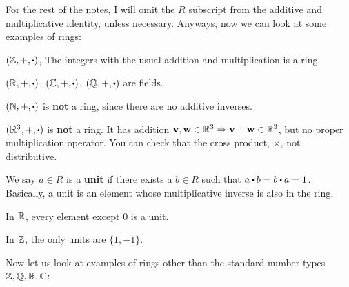 \documentclass[../Main.tex]{subfiles}
\begin{document}
For the rest of the notes, I will omit the $R$ subscript from the additive and multiplicative identity, unless necessary. Anyways, now we can look at some examples of rings:
\begin{example}
	$(\Z,+,\rdot)$, The integers with the usual addition and multiplication is a ring.
\end{example}
\begin{example}
	$(\R, +, \rdot)$, $(\C, +, \rdot)$, $(\Q, +, \rdot)$ are fields.
\end{example}
\begin{example}
	$(\N, +, \rdot)$ is \textbf{not} a ring, since there are no additive inverses.
\end{example}
\begin{example}
	$(\R^3, +, \rdot)$ is \textbf{not} a ring. It has addition $\mathbf{v},\mathbf{w} \in \mathbb{R}^3 \Rightarrow \mathbf{v}+\mathbf{w} \in \mathbb{R}^3$, but no proper multiplication operator. You can check that the cross product, $\times$, not distributive.
\end{example}
\begin{dfn}[title= Unit]
	We say $a \in R$ is a \textbf{unit} if there exists a $ b \in R$ such that $a\rdot b=b\rdot a=1$. \newline Basically, a unit is an element whose multiplicative inverse is also in the ring.
\end{dfn}
\begin{example}
	In $\mathbb{R}$, every element except $0$ is a unit.
\end{example}
\begin{example}
	In $\mathbb{Z}$, the only units are $\{1,-1\}$.
\end{example}
Now let us look at examples of rings other than the standard number types $\mathbb{Z},\mathbb{Q},\mathbb{R},\mathbb{C}$:
\end{document}
